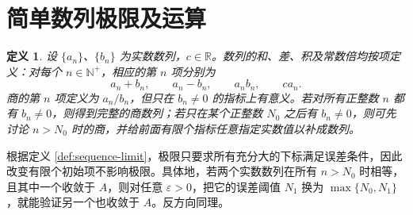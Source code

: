 \documentclass[UTF8,fontset=fandol,11pt]{ctexart}
\newtheorem{definition}{定义}[section]
\begin{document}
\section{简单数列极限及运算}\label{sec:S02}
\begin{definition}
设 $\{a_n\}$、$\{b_n\}$ 为实数数列，$c\in\mathbb{R}$。数列的和、差、积及常数倍均按项定义：对每个 $n\in\mathbb{N}^+$，相应的第 $n$ 项分别为
\[
a_n+b_n,\qquad a_n-b_n,\qquad a_nb_n,\qquad ca_n.
\]
商的第 $n$ 项定义为 $a_n/b_n$，但只在 $b_n\ne0$ 的指标上有意义。若对所有正整数 $n$ 都有 $b_n\ne0$，则得到完整的商数列；若只在某个正整数 $N_0$ 之后有 $b_n\ne0$，则可先讨论 $n>N_0$ 时的商，并给前面有限个指标任意指定实数值以补成数列。
\end{definition}
根据定义 \ref{def:sequence-limit}，极限只要求所有充分大的下标满足误差条件，因此改变有限个初始项不影响极限。具体地，若两个实数数列在所有 $n>N_0$ 时相等，且其中一个收敛于 $A$，则对任意 $\varepsilon>0$，把它的误差阈值 $N_1$ 换为 $\max\{N_0,N_1\}$，就能验证另一个也收敛于 $A$。反方向同理。
\end{document}
